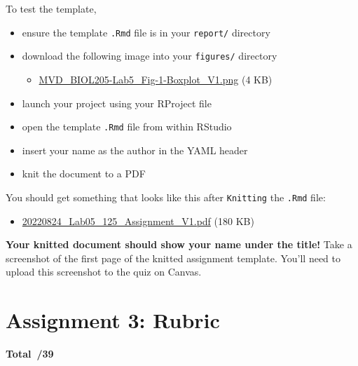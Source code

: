 \documentclass[
]{book}
\providecommand{\tightlist}{%
  \setlength{\itemsep}{0pt}\setlength{\parskip}{0pt}}
\begin{document}
To test the template,

\begin{itemize}
\tightlist
\item
  ensure the template \texttt{.Rmd} file is in your \texttt{report/} directory
\item
  download the following image into your \texttt{figures/} directory

  \begin{itemize}
  \tightlist
  \item
    \href{https://osf.io/download/zuehg}{MVD\_BIOL205-Lab5\_Fig-1-Boxplot\_V1.png} (4 KB)
  \end{itemize}
\item
  launch your project using your RProject file
\item
  open the template \texttt{.Rmd} file from within RStudio
\item
  insert your name as the author in the YAML header
\item
  knit the document to a PDF
\end{itemize}

You should get something that looks like this after \texttt{Knitting} the \texttt{.Rmd} file:

\begin{itemize}
\tightlist
\item
  \href{https://osf.io/download/3k8ve}{20220824\_Lab05\_125\_Assignment\_V1.pdf} (180 KB)
\end{itemize}

\textbf{Your knitted document should show your name under the title!} Take a screenshot of the first page of the knitted assignment template. You'll need to upload this screenshot to the quiz on Canvas.

\hypertarget{assignment-3-rubric}{%
\section*{Assignment 3: Rubric}\label{assignment-3-rubric}}

\textbf{Total~/39}
\end{document}
